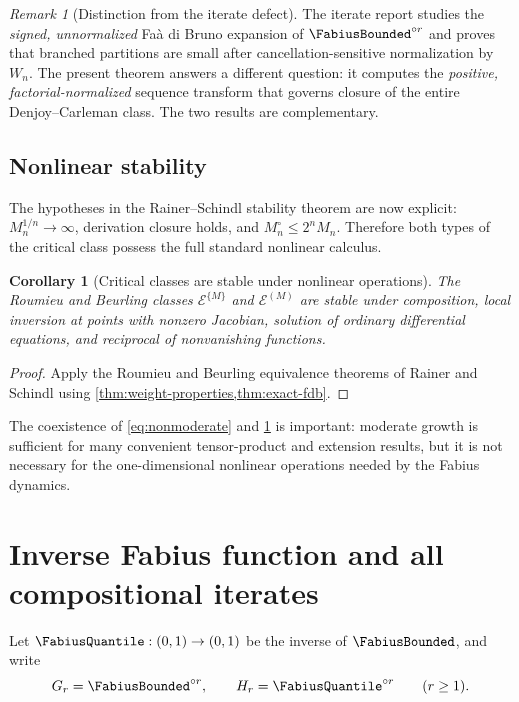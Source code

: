 \documentclass[11pt,a4paper]{article}
\newtheorem{corollary}[theorem]{Corollary}
\theoremstyle{definition}
\theoremstyle{remark}
\newtheorem{remark}[theorem]{Remark}
\newcommand{\comp}{\mathbin{\circ}}
\newcommand{\Roumieu}[1]{\mathcal{E}^{\{#1\}}}
\newcommand{\Beurling}[1]{\mathcal{E}^{(#1)}}
\begin{document}
\begin{remark}[Distinction from the iterate defect]
The iterate report \cite{ProveItIterates} studies the \emph{signed, unnormalized}
Fa\`a di Bruno expansion of $\FabiusBounded^{\comp r}$ and proves that branched partitions are
small after cancellation-sensitive normalization by $W_n$.  The present theorem
answers a different question: it computes the \emph{positive,
factorial-normalized} sequence transform that governs closure of the entire
Denjoy--Carleman class.  The two results are complementary.
\end{remark}

\subsection{Nonlinear stability}

The hypotheses in the Rainer--Schindl stability theorem are now explicit:
$M_n^{1/n}\to\infty$, derivation closure holds, and
$M_n^\circ\le2^nM_n$.  Therefore both types of the critical class possess the full
standard nonlinear calculus.

\begin{corollary}[Critical classes are stable under nonlinear operations]
\label{cor:stability}
The Roumieu and Beurling classes $\Roumieu{M}$ and $\Beurling{M}$ are stable under
composition, local inversion at points with nonzero Jacobian, solution of ordinary
differential equations, and reciprocal of nonvanishing functions.
\end{corollary}

\begin{proof}
Apply the Roumieu and Beurling equivalence theorems of Rainer and Schindl
\cite{RainerSchindl} using \cref{thm:weight-properties,thm:exact-fdb}.
\end{proof}

The coexistence of \cref{eq:nonmoderate} and \cref{cor:stability} is important:
moderate growth is sufficient for many convenient tensor-product and extension
results, but it is not necessary for the one-dimensional nonlinear operations
needed by the Fabius dynamics.

\section{Inverse Fabius function and all compositional iterates}
\label{sec:inverse-iterates}

Let $\FabiusQuantile:(0,1)\to(0,1)$ be the inverse of $\FabiusBounded$, and write
\[
  G_r=\FabiusBounded^{\comp r},
  \qquad
  H_r=\FabiusQuantile^{\comp r}
  \qquad(r\ge1).
\]
\end{document}
